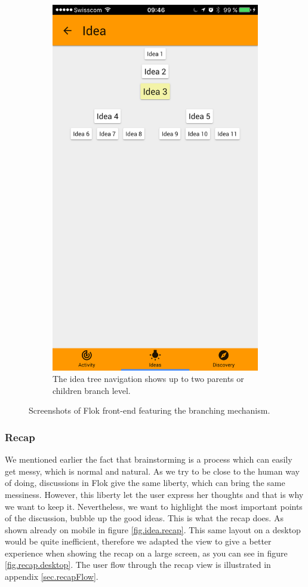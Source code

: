 \documentclass[a4paper,12pt,twoside]{article}
\begin{document}
\begin{figure}[!htb]
\begin{subfigure}[t]{.48\textwidth}
        \includegraphics[width=.67\textwidth]{images/branches_navigation.png}
        \caption{The idea tree navigation shows up to two parents or children branch level.}
    \end{subfigure}
    \caption{Screenshots of Flok front-end featuring the branching mechanism.}
    \label{fig.branches}
\end{figure}

\subsubsection{Recap}
\label{sec.recap}
We mentioned earlier the fact that brainstorming is a process which can easily get messy, which is normal and natural.
As we try to be close to the human way of doing, discussions in Flok give the same liberty, which can bring the same messiness.
However, this liberty let the user express her thoughts and that is why we want to keep it.
Nevertheless, we want to highlight the most important points of the discussion, bubble up the good ideas.
This is what the recap does.
As shown already on mobile in figure \ref{fig.idea.recap}.
This same layout on a desktop would be quite inefficient, therefore we adapted the view to give a better experience when showing the recap on a large screen, as you can see in figure \ref{fig.recap.desktop}.
The user flow through the recap view is illustrated in appendix \ref{sec.recapFlow}.
\end{document}
